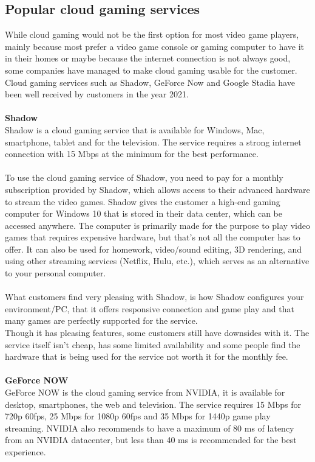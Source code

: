 \subsection{Popular cloud gaming services}
While cloud gaming would not be the first option for most video game players, mainly because most prefer a video game console or gaming computer to have it in their homes or maybe because the internet connection is not always good, some companies have managed to make cloud gaming usable for the customer. Cloud gaming services such as Shadow, GeForce Now and Google Stadia have been well received by customers in the year 2021.\\\\
\textbf{Shadow}\\
Shadow is a cloud gaming service that is available for Windows, Mac, smartphone, tablet and for the television. The service requires a strong internet connection with 15 Mbps at the minimum for the best performance.\\\\
To use the cloud gaming service of Shadow, you need to pay for a monthly subscription provided by Shadow, which allows access to their advanced hardware to stream the video games. Shadow gives the customer a high-end gaming computer for Windows 10 that is stored in their data center, which can be accessed anywhere. The computer is primarily made for the purpose to play video games that requires expensive hardware, but that's not all the computer has to offer. It can also be used for homework, video/sound editing, 3D rendering, and using other streaming services (Netflix, Hulu, etc.), which serves as an alternative to your personal computer.\\\\
What customers find very pleasing with Shadow, is how Shadow configures your environment/PC, that it offers responsive connection and game play and that many games are perfectly supported for the service.\\Though it has pleasing features, some customers still have downsides with it. The service itself isn't cheap, has some limited availability and some people find the hardware that is being used for the service not worth it for the monthly fee.\\\\
\textbf{GeForce NOW}\\
GeForce NOW is the cloud gaming service from NVIDIA, it is available for desktop, smartphones, the web and television. The service requires 15 Mbps for 720p 60fps, 25 Mbps for 1080p 60fps and 35 Mbps for 1440p game play streaming. NVIDIA also recommends to have a maximum of 80 ms of latency from an NVIDIA datacenter, but less than 40 ms is recommended for the best experience.\\\\

